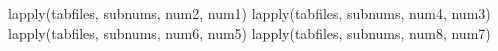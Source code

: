 
\begin{Schunk}
\begin{Sinput}
lapply(tabfiles, subnums, num2, num1)
lapply(tabfiles, subnums, num4, num3)
lapply(tabfiles, subnums, num6, num5)
lapply(tabfiles, subnums, num8, num7)
\end{Sinput}
\end{Schunk}



